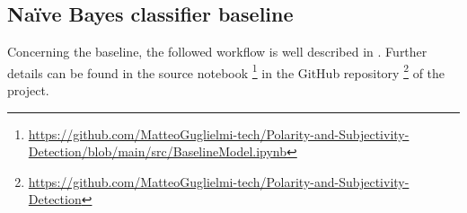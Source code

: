 \subsection{Na\"{i}ve Bayes classifier baseline}
\label{subsec:baseline}
Concerning the baseline, the followed workflow is well described in \textbf{}. Further details can be found in the source notebook 
\footnote{\url{https://github.com/MatteoGuglielmi-tech/Polarity-and-Subjectivity-Detection/blob/main/src/BaselineModel.ipynb}} in the GitHub repository 
\footnote{\url{https://github.com/MatteoGuglielmi-tech/Polarity-and-Subjectivity-Detection}} of the project.\\
%

\vspace{-0.5cm}
